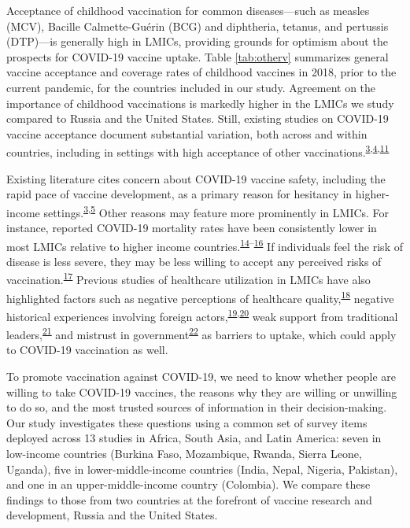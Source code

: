 \documentclass[
  12pt,
]{article}
\begin{document}
Acceptance of childhood vaccination for common diseases---such as measles (MCV), Bacille Calmette-Guérin (BCG) and diphtheria, tetanus, and pertussis (DTP)---is generally high in LMICs, providing grounds for optimism about the prospects for COVID-19 vaccine uptake. Table \ref{tab:otherv} summarizes general vaccine acceptance and coverage rates of childhood vaccines in 2018, prior to the current pandemic, for the countries included in our study. Agreement on the importance of childhood vaccinations is markedly higher in the LMICs we study compared to Russia and the United States. Still, existing studies on COVID-19 vaccine acceptance document substantial variation, both across and within countries, including in settings with high acceptance of other vaccinations.\textsuperscript{\protect\hyperlink{ref-wouters2021challenges}{3},\protect\hyperlink{ref-defigueiredo2020lancet}{4},\protect\hyperlink{ref-lazarus2020nature}{11}}

Existing literature cites concern about COVID-19 vaccine safety, including the rapid pace of vaccine development, as a primary reason for hesitancy in higher-income settings.\textsuperscript{\protect\hyperlink{ref-wouters2021challenges}{3},\protect\hyperlink{ref-boyon2020ipsos}{5}} Other reasons may feature more prominently in LMICs. For instance, reported COVID-19 mortality rates have been consistently lower in most LMICs relative to higher income countries.\textsuperscript{\protect\hyperlink{ref-biccard2021patient}{14}--\protect\hyperlink{ref-maeda2021puzzle}{16}} If individuals feel the risk of disease is less severe, they may be less willing to accept any perceived risks of vaccination.\textsuperscript{\protect\hyperlink{ref-brewer2007meta}{17}} Previous studies of healthcare utilization in LMICs have also highlighted factors such as negative perceptions of healthcare quality,\textsuperscript{\protect\hyperlink{ref-christensen2020building}{18}} negative historical experiences involving foreign actors,\textsuperscript{\protect\hyperlink{ref-Lowes2018}{19},\protect\hyperlink{ref-martinez2021vaccines}{20}} weak support from traditional leaders,\textsuperscript{\protect\hyperlink{ref-Jegede2007}{21}} and mistrust in government\textsuperscript{\protect\hyperlink{ref-BLAIR201789}{22}} as barriers to uptake, which could apply to COVID-19 vaccination as well.

To promote vaccination against COVID-19, we need to know whether people are willing to take COVID-19 vaccines, the reasons why they are willing or unwilling to do so, and the most trusted sources of information in their decision-making. Our study investigates these questions using a common set of survey items deployed across 13 studies in Africa, South Asia, and Latin America: seven in low-income countries (Burkina Faso, Mozambique, Rwanda, Sierra Leone, Uganda), five in lower-middle-income countries (India, Nepal, Nigeria, Pakistan), and one in an upper-middle-income country (Colombia). We compare these findings to those from two countries at the forefront of vaccine research and development, Russia and the United States.
\end{document}
